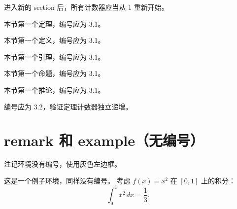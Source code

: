 \documentclass[12pt,a4paper]{ctexart}
\begin{document}
进入新的 section 后，所有计数器应当从 $1$ 重新开始。

\begin{theorem}
本节第一个定理，编号应为 3.1。
\end{theorem}

\begin{definition}
本节第一个定义，编号应为 3.1。
\end{definition}

\begin{lemma}
本节第一个引理，编号应为 3.1。
\end{lemma}

\begin{proposition}
本节第一个命题，编号应为 3.1。
\end{proposition}

\begin{corollary}
本节第一个推论，编号应为 3.1。
\end{corollary}

\begin{theorem}[第二个定理]
编号应为 3.2，验证定理计数器独立递增。
\end{theorem}

\section{remark 和 example（无编号）}

\begin{remark}
注记环境没有编号，使用灰色左边框。
\end{remark}

\begin{example}
这是一个例子环境，同样没有编号。
考虑 $f(x)=x^2$ 在 $[0,1]$ 上的积分：
\[
  \int_0^1 x^2\,dx = \frac{1}{3}.
\]
\end{example}
\end{document}
